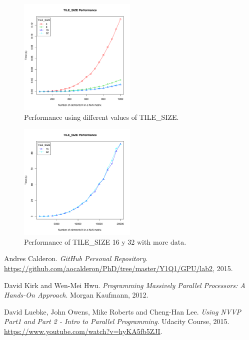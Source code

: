 \documentclass[a4paper,10pt]{scrartcl}
\begin{document}
\begin{enumerate}
 \begin{figure}
 \centering
 \includegraphics[width=0.5\textwidth]{./TilesizePerformance_50-1K}
 \caption{Performance using different values of TILE\_SIZE.}\label{fig:TilesizePerformance_50-1K}
 \end{figure}

 \begin{figure}
 \centering
 \includegraphics[width=0.5\textwidth]{./TilesizePerformance_1K-20K}
 \caption{Performance of TILE\_SIZE 16 y 32 with more data.}\label{fig:TilesizePerformance_1K-20K}
 \end{figure}
 
\end{enumerate}

\begin{thebibliography}{9}
Andres Calderon.
\textit{GitHub Personal Repository}. 
\url{https://github.com/aocalderon/PhD/tree/master/Y1Q1/GPU/lab2}, 2015.
 
David Kirk and Wen-Mei Hwu.
\textit{Programming Massively Parallel Processors: A Hands-On Approach}. 
Morgan Kaufmann, 2012.

David Luebke, John Owens, Mike Roberts and Cheng-Han Lee.
\textit{Using NVVP Part1 and Part 2 - Intro to Parallel Programming}. 
Udacity Course, 2015. \url{https://www.youtube.com/watch?v=hyKA5fb5ZJI}.

\end{thebibliography}
 
\end{document}
